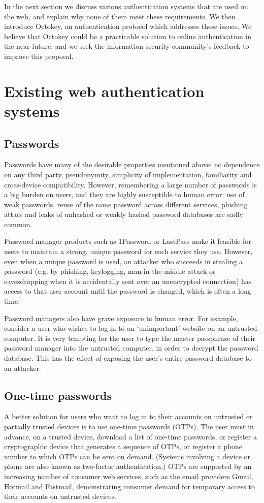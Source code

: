 In the next section we discuss various authentication systems that are used on the web, and explain
why none of them meet these requirements. We then introduce Octokey, an authentication protocol
which addresses these issues. We believe that Octokey could be a practicable solution to online
authentication in the near future, and we seek the information security community's feedback to
improve this proposal.

\section{Existing web authentication systems}
\subsection{Passwords}

Passwords have many of the desirable properties mentioned above: no dependence on any third party,
pseudonymity, simplicity of implementation, familiarity and cross-device compatibility. However,
remembering a large number of passwords is a big burden on users, and they are highly susceptible to
human error: use of weak passwords, reuse of the same password across different services, phishing
attacs and leaks of unhashed or weakly hashed password databases are sadly common.

Password manager products such as 1Password or LastPass make it feasible for users to maintain a
strong, unique password for each service they use. However, even when a unique password is used, an
attacker who succeeds in stealing a password (e.g. by phishing, keylogging, man-in-the-middle attack
or eavesdropping when it is accidentally sent over an unencrypted connection) has access to that
user account until the password is changed, which is often a long time.

Password managers also have grave exposure to human error. For example, consider a user who wishes
to log in to an `unimportant' website on an untrusted computer. It is very tempting for the user to
type the master passphrase of their password manager into the untrusted computer, in order to
decrypt the password database. This has the effect of exposing the user's entire password database
to an attacker.

\subsection{One-time passwords}

A better solution for users who want to log in to their accounts on untrusted or partially trusted
devices is to use one-time passwords (OTPs). The user must in advance, on a trusted device, download
a list of one-time passwords, or register a cryptographic device that generates a sequence of OTPs,
or register a phone number to which OTPs can be sent on demand. (Systems involving a device or phone
are also known as two-factor authentication.) OTPs are supported by an increasing number of consumer
web services, such as the email providers Gmail, Hotmail and Fastmail, demonstrating consumer demand
for temporary access to their accounts on untrusted devices.

